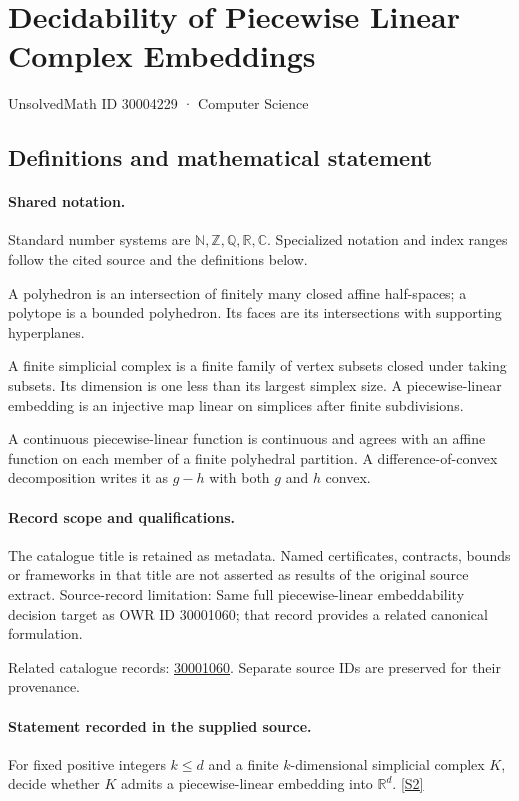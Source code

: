 \documentclass[11pt]{article}
\newcommand{\sref}[2]{\hyperlink{source:#1:#2}{[S#2]}}
\begin{document}
\setcounter{section}{30004228}
\section{Decidability of Piecewise Linear Complex Embeddings}\label{30004229}
{\small\sffamily UnsolvedMath ID 30004229 · Computer Science}
\subsection{Definitions and mathematical statement}

\paragraph{Shared notation.}Standard number systems are $\mathbb N,\mathbb Z,\mathbb Q,\mathbb R,\mathbb C$. Specialized notation and index ranges follow the cited source and the definitions below.


A polyhedron is an intersection of finitely many closed affine half-spaces; a polytope is a bounded polyhedron. Its faces are its intersections with supporting hyperplanes.

A finite simplicial complex is a finite family of vertex subsets closed under taking subsets. Its dimension is one less than its largest simplex size. A piecewise-linear embedding is an injective map linear on simplices after finite subdivisions.

A continuous piecewise-linear function is continuous and agrees with an affine function on each member of a finite polyhedral partition. A difference-of-convex decomposition writes it as $g-h$ with both $g$ and $h$ convex.
\paragraph{Record scope and qualifications.}
The catalogue title is retained as metadata. Named certificates, contracts, bounds or frameworks in that title are not asserted as results of the original source extract.
Source-record limitation: Same full piecewise-linear embeddability decision target as OWR ID 30001060; that record provides a related canonical formulation.

Related catalogue records: \href{https://mehmetmars7.github.io/Erdosproblems-llm-hunter/problem.html?type=open_problems&id=30001060}{30001060}. Separate source IDs are preserved for their provenance.
\paragraph{Statement recorded in the supplied source.}
For fixed positive integers $k\leq d$ and a finite $k$-dimensional simplicial complex $K$, decide whether $K$ admits a piecewise-linear embedding into $\mathbb R^d$. \sref{30004229}{2}
\end{document}
